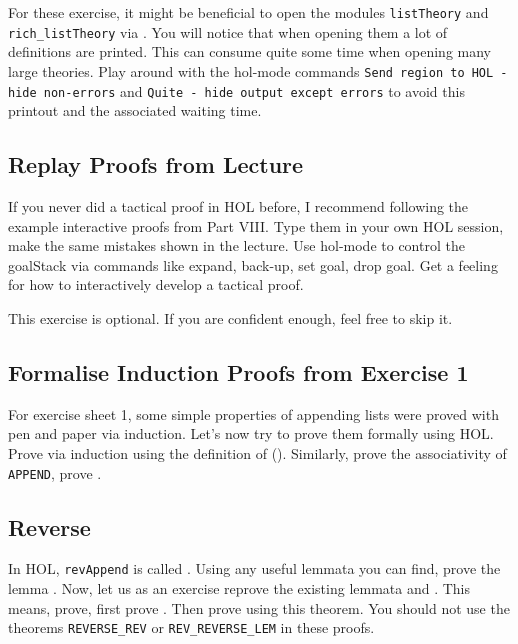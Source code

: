 \documentclass[a4paper,10pt,oneside]{scrartcl}
\begin{document}
For these exercise, it might be beneficial to open the modules \texttt{listTheory} and \texttt{rich\_listTheory} via . You will notice that when opening them a lot of definitions are printed. This can consume quite some time when opening many large theories. Play around with the hol-mode commands
\texttt{Send region to HOL - hide non-errors} and \texttt{Quite - hide output except errors} to avoid this printout and the associated waiting time.


\subsection{Replay Proofs from Lecture}

If you never did a tactical proof in HOL before, I recommend following the example interactive proofs from Part VIII. 
Type them in your own HOL session, make the same mistakes shown in the lecture. Use hol-mode to control the goalStack via
commands like expand, back-up, set goal, drop goal. Get a feeling for how to interactively develop a tactical proof.

This exercise is optional. If you are confident enough, feel free to skip it.

\subsection{Formalise Induction Proofs from Exercise 1}

For exercise sheet 1, some simple properties of appending lists were proved with pen and paper via induction. Let's now try to prove them formally using HOL. Prove  via induction using the definition of  (\hol{++}). Similarly, prove the associativity of \texttt{APPEND}, \ie prove . 

\subsection{Reverse}

In HOL, \texttt{revAppend} is called . Using any useful lemmata you can find, prove
the lemma . Now, let us as an exercise reprove the existing lemmata  and . This means, prove, first prove . Then prove  using this theorem. You should not use the theorems \texttt{REVERSE\_REV} or \texttt{REV\_REVERSE\_LEM} in these proofs.
\end{document}
